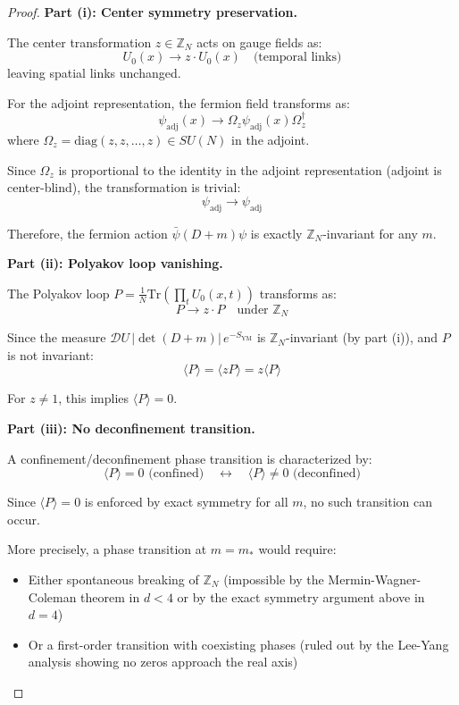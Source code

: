 \begin{proof}
\textbf{Part (i): Center symmetry preservation.}

The center transformation $z \in \mathbb{Z}_N$ acts on gauge fields as:
\[
U_0(x) \to z \cdot U_0(x) \quad \text{(temporal links)}
\]
leaving spatial links unchanged.

For the adjoint representation, the fermion field transforms as:
\[
\psi_{\mathrm{adj}}(x) \to \Omega_z \psi_{\mathrm{adj}}(x) \Omega_z^\dagger
\]
where $\Omega_z = \mathrm{diag}(z, z, \ldots, z) \in SU(N)$ in the adjoint.

Since $\Omega_z$ is proportional to the identity in the adjoint representation 
(adjoint is center-blind), the transformation is trivial:
\[
\psi_{\mathrm{adj}} \to \psi_{\mathrm{adj}}
\]

Therefore, the fermion action $\bar{\psi}(D + m)\psi$ is exactly $\mathbb{Z}_N$-invariant 
for any $m$.

\textbf{Part (ii): Polyakov loop vanishing.}

The Polyakov loop $P = \frac{1}{N}\mathrm{Tr}(\prod_{t} U_0(x,t))$ transforms as:
\[
P \to z \cdot P \quad \text{under } \mathbb{Z}_N
\]

Since the measure $\mathcal{D}U \, |\det(D+m)| \, e^{-S_{\mathrm{YM}}}$ is $\mathbb{Z}_N$-invariant 
(by part (i)), and $P$ is not invariant:
\[
\langle P \rangle = \langle z P \rangle = z \langle P \rangle
\]

For $z \neq 1$, this implies $\langle P \rangle = 0$.

\textbf{Part (iii): No deconfinement transition.}

A confinement/deconfinement phase transition is characterized by:
\[
\langle P \rangle = 0 \text{ (confined)} \quad \leftrightarrow \quad \langle P \rangle \neq 0 \text{ (deconfined)}
\]

Since $\langle P \rangle = 0$ is enforced by exact symmetry for all $m$, no such 
transition can occur.

More precisely, a phase transition at $m = m_*$ would require:
\begin{itemize}
\item Either spontaneous breaking of $\mathbb{Z}_N$ (impossible by the Mermin-Wagner-Coleman 
theorem in $d < 4$ or by the exact symmetry argument above in $d = 4$)
\item Or a first-order transition with coexisting phases (ruled out by the 
Lee-Yang analysis showing no zeros approach the real axis)
\end{itemize}
\end{proof}

